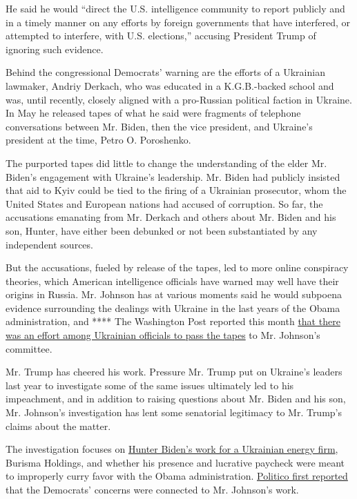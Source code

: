 He said he would ``direct the U.S. intelligence community to report
publicly and in a timely manner on any efforts by foreign governments
that have interfered, or attempted to interfere, with U.S. elections,''
accusing President Trump of ignoring such evidence.

Behind the congressional Democrats' warning are the efforts of a
Ukrainian lawmaker, Andriy Derkach, who was educated in a K.G.B.-backed
school and was, until recently, closely aligned with a pro-Russian
political faction in Ukraine. In May he released tapes of what he said
were fragments of telephone conversations between Mr. Biden, then the
vice president, and Ukraine's president at the time, Petro O.
Poroshenko.

The purported tapes did little to change the understanding of the elder
Mr. Biden's engagement with Ukraine's leadership. Mr. Biden had publicly
insisted that aid to Kyiv could be tied to the firing of a Ukrainian
prosecutor, whom the United States and European nations had accused of
corruption. So far, the accusations emanating from Mr. Derkach and
others about Mr. Biden and his son, Hunter, have either been debunked or
not been substantiated by any independent sources.

But the accusations, fueled by release of the tapes, led to more online
conspiracy theories, which American intelligence officials have warned
may well have their origins in Russia. Mr. Johnson has at various
moments said he would subpoena evidence surrounding the dealings with
Ukraine in the last years of the Obama administration, and **** The
Washington Post reported this month
\href{https://www.washingtonpost.com/national-security/for-months-trump-allies-hunted-for-tapes-of-biden-in-ukraine-now-theyre-turning-up/2020/06/30/f3aeaba8-a67b-11ea-8681-7d471bf20207_story.html}{that
there was an effort among Ukrainian officials to pass the tapes} to Mr.
Johnson's committee.

Mr. Trump has cheered his work. Pressure Mr. Trump put on Ukraine's
leaders last year to investigate some of the same issues ultimately led
to his impeachment, and in addition to raising questions about Mr. Biden
and his son, Mr. Johnson's investigation has lent some senatorial
legitimacy to Mr. Trump's claims about the matter.

The investigation focuses on
\href{https://www.nytimes.com/2019/05/01/us/politics/biden-son-ukraine.html}{Hunter
Biden's work for a Ukrainian energy firm}, Burisma Holdings, and whether
his presence and lucrative paycheck were meant to improperly curry favor
with the Obama administration.
\href{https://www.politico.com/news/2020/07/20/democrats-fbi-briefing-foreign-interference-campaign-373134}{Politico
first reported} that the Democrats' concerns were connected to Mr.
Johnson's work.

